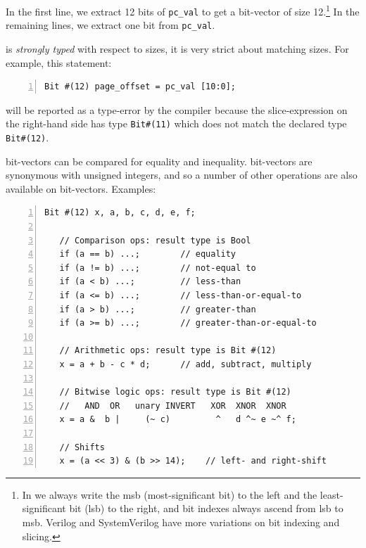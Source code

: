 In the first line, we extract 12 bits of \verb|pc_val| to get a
bit-vector of size 12.\footnote{In {\BSV} we always write the msb
(most-significant bit) to the left and the least-significant bit (lsb)
to the right, and bit indexes always ascend from lsb to msb.  Verilog
and SystemVerilog have more variations on bit indexing and slicing.}
In the remaining lines, we extract one bit from \verb|pc_val|.

{\BSV} is \emph{strongly typed} with respect to sizes, {\ie} it is very
strict about matching sizes.  For example, this statement:

{\footnotesize
\begin{Verbatim}[frame=single, numbers=left]
   Bit #(12) page_offset = pc_val [10:0];
\end{Verbatim}
}

will be reported as a type-error by the {\bsc} compiler because
the slice-expression on the right-hand side has type \verb|Bit#(11)|
which does not match the declared type \verb|Bit#(12)|.




{\BSV} bit-vectors can be compared for equality and inequality.  {\BSV}
bit-vectors are synonymous with unsigned integers, and so a number of
other operations are also available on bit-vectors.  Examples:


{\footnotesize
\begin{Verbatim}[frame=single, numbers=left]
   Bit #(12) x, a, b, c, d, e, f;

   // Comparison ops: result type is Bool
   if (a == b) ...;        // equality
   if (a != b) ...;        // not-equal to
   if (a < b) ...;         // less-than
   if (a <= b) ...;        // less-than-or-equal-to
   if (a > b) ...;         // greater-than
   if (a >= b) ...;        // greater-than-or-equal-to

   // Arithmetic ops: result type is Bit #(12)
   x = a + b - c * d;      // add, subtract, multiply

   // Bitwise logic ops: result type is Bit #(12)
   //   AND  OR   unary INVERT   XOR  XNOR  XNOR
   x = a &  b |     (~ c)         ^   d ^~ e ~^ f;

   // Shifts
   x = (a << 3) & (b >> 14);    // left- and right-shift
\end{Verbatim}
}


